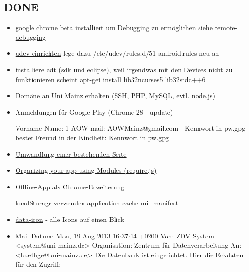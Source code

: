 \documentclass[a4paper]{scrartcl}
\begin{document}
		\subsection{DONE}
			\begin{itemize}
				\item google chrome beta installiert um Debugging zu ermöglichen siehe \href{https://developers.google.com/chrome-developer-tools/docs/remote-debugging}{remote-debugging}
				\item \href{http://developer.android.com/tools/device.html#setting-up}{udev einrichten} lege dazu /etc/udev/rules.d/51-android.rules neu an
				\item installiere adt (sdk und eclipse), weil irgendwas mit den Devices nicht zu funktionieren scheint \newline apt-get install lib32ncurses5 lib32stdc++6
				\item Domäne an Uni Mainz erhalten (SSH, PHP, MySQL, evtl. node.js)
				\item Anmeldungen für Google-Play (Chrome 28 - update)

					Vorname Name: 1 AOW \newline
					mail: AOWMainz@gmail.com - Kennwort in pw.gpg \newline
					bester Freund in der Kindheit: Kennwort in pw.gpg
				\item \href{http://www.ofbrooklyn.com/2012/11/13/backbonification-migrating-javascript-to-backbone}{Umwandlung einer bestehenden Seite}
				\item \href{http://backbonetutorials.com/organizing-backbone-using-modules/}{Organizing your app using Modules (require.js)}
				\item \href{http://developer.chrome.com/apps/about_apps.html}{Offline-App} als Chrome-Erweiterung
					
					\href{http://docs.webplatform.org/wiki/tutorials/offline_storage}{localStorage verwenden}\newline
					\href{http://docs.webplatform.org/wiki/tutorials/appcache_beginner}{application cache} mit manifest
				\item \href{http://jquerymobile.com/demos/1.3.0-rc.1/docs/lists/lists-themes.html}{data-icon} - alle Icons auf einen Blick
				\item Mail Datum:  Mon, 19 Aug 2013 16:37:14 +0200\newline
					Von: ZDV System <system@uni-mainz.de>\newline
					Organisation:   Zentrum für Datenverarbeitung\newline
					An:     <baethge@uni-mainz.de>\newline 
					Die Datenbank ist eingerichtet. Hier die Eckdaten für den Zugriff:


\end{itemize}
\end{document}
